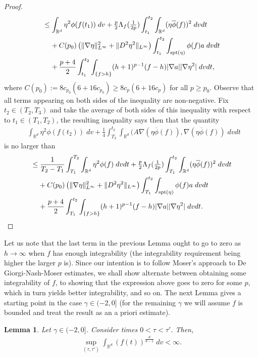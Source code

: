 \documentclass[12pt,american]{amsart}
\numberwithin{equation}{section}
\theoremstyle{plain}
\newtheorem{lem}[thm]{Lemma}
\theoremstyle{definition}                  %
\begin{document}
\begin{proof}
\begin{align*}
      & \leq \int_{\mathbb{R}^d}\eta^2 \phi(f(t_1))\;dv+\tfrac{p}{2}\Lambda_f (\tfrac{1}{2p})\int_{t_1}^{t_2}\int_{\mathbb{R}^d}(\eta \overline{\phi}(f))^2\;dvdt\\
      & \;\;\;\;+C(p_0)\left (\|\nabla \eta\|_{L^\infty}^2+\|D^2\eta^2\|_{L^\infty} \right )\int_{t_1}^{t_2}\int_{\textnormal{spt}(\eta)}\phi(f)a\;dvdt\\
      &\;\;\;\;+\frac{p+4}{2}\int_{t_1}^{t_2}\int_{\{f>h\}} (h+1)^{p-1}(f-h)|\nabla a||\nabla \eta^2|\;dvdt,
    \end{align*}
    where $C(p_0) := 8c_{p_0}(6+16c_{p_0}) \geq 8c_{p}(6+16c_{p})$ for all $p\geq p_0$. Observe that all terms appearing on both sides of the inequality are non-negative. Fix $t_2 \in (T_2,T_3)$ and take the average of both sides of this inequality with respect to $t_1 \in (T_1,T_2)$, the resulting inequality says then that the quantity
    \begin{align*}
      & \int_{\mathbb{R}^d}\eta^2 \phi(f(t_2))\;dv + \frac{1}{4}\int_{T_2}^{t_2}\int_{\mathbb{R}^d}(A\nabla (\eta \overline{\phi}(f)),\nabla (\eta \overline{\phi}(f) )\;dvdt
    \end{align*}
    is no larger than	
    \begin{align*}		  
      & \leq \frac{1}{T_2-T_1}\int_{T_1}^{T_2}\int_{\mathbb{R}^d}\eta^2 \phi(f)\;dvdt+\tfrac{p}{2}\Lambda_f(\tfrac{1}{2p})\int_{T_1}^{t_2}\int_{\mathbb{R}^d}(\eta \overline{\phi}(f))^2\;dvdt\\
      & \;\;\;\;+C(p_0)\left (\|\nabla \eta\|_{L^\infty}^2+\|D^2\eta^2\|_{L^\infty} \right )\int_{T_1}^{t_2}\int_{\textnormal{spt}(\eta)}\phi(f)a\;dvdt\\
      &\;\;\;\;+\frac{p+4}{2}\int_{T_1}^{t_2}\int_{\{f>h\}} (h+1)^{p-1}(f-h)|\nabla a||\nabla \eta^2|\;dvdt.
    \end{align*}
  
  \end{proof}
  
 
  Let us note that the last term in the previous Lemma ought to go to zero as $h\to \infty$ when $f$ has enough integrability (the integrability requirement being higher the larger $p$ is). Since our intention is to follow Moser's approach to De Giorgi-Nash-Moser estimates, we shall show alternate between obtaining some integrability of $f$, to showing that the expression above goes to zero for some $p$, which in turn yields better integrability, and so on. The next Lemma gives a starting point in the case $\gamma \in (-2,0]$ (for the remaining $\gamma$ we will assume $f$ is bounded and treat the result as an a priori estimate). 
  \begin{lem}\label{lem:Ld/d-1 bound for f unif in time}
  Let $\gamma \in (-2,0]$. Consider times $0<\tau<\tau'$. Then, 
   \begin{align*}
      \sup \limits_{(\tau,\tau')} \int_{\mathbb{R}^d} (f(t))^{\frac{d}{d-1}}\;dv < \infty.
    \end{align*}	
  \end{lem}
  
\end{document}
